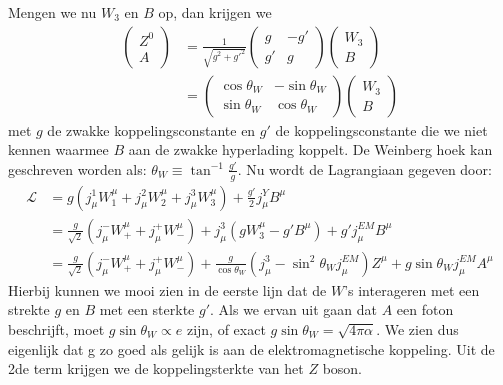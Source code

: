 \documentclass[../main.tex]{subfiles}
\begin{document}
Mengen we nu $W_3$ en $B$ op, dan krijgen we 
\begin{equation}
    \begin{aligned}
        \label{eq:w_b_mixing}
        \begin{pmatrix}
            Z^0\\
            A
        \end{pmatrix}
        &= \frac{1}{\sqrt{g^2+g'^2}} 
        \begin{pmatrix}
            g & -g'\\
            g' & g
        \end{pmatrix}
        \begin{pmatrix}
            W_3\\
            B
        \end{pmatrix}\\
        &=
        \begin{pmatrix}
            \cos\theta_W & -\sin\theta_W\\
            \sin\theta_W & \cos\theta_W
        \end{pmatrix}
        \begin{pmatrix}
            W_3\\
            B
        \end{pmatrix}
    \end{aligned}
\end{equation}
met $g$ de zwakke koppelingsconstante en $g'$ de koppelingsconstante die we niet kennen waarmee $B$ aan de zwakke hyperlading koppelt. De Weinberg hoek kan geschreven worden als: $\theta_W\equiv \tan^{-1} \frac{g'}{g}$. Nu wordt de Lagrangiaan gegeven door:
\begin{equation}
    \begin{aligned}
        \label{eq:elektozwakke_lagrangiaan}
        \mathcal{L} &= g(j_\mu^1W_1^\mu+j_\mu^2W_2^\mu+j_\mu^3W_3^\mu)+ \frac{g'}{2} j_\mu^YB^\mu\\
                    &= \frac{g}{\sqrt{2}} (j_\mu^-W_+^\mu+j_\mu^+W_-^\mu) + j_\mu^3(gW_3^\mu-g'B^\mu) + g'j_\mu^{EM}B^\mu\\
                    &= \frac{g}{\sqrt{2}} (j_\mu^-W_+^\mu+j_\mu^+W_-^\mu) + \frac{g}{\cos\theta_W} (j_\mu^3 - \sin^2\theta_Wj_\mu^{EM})Z^\mu + g\sin\theta_Wj_\mu^{EM}A^\mu
    \end{aligned}
\end{equation}
Hierbij kunnen we mooi zien in de eerste lijn dat de $W$'s interageren met een strekte $g$ en $B$ met een sterkte $g'$. Als we ervan uit gaan dat $A$ een foton beschrijft, moet $g\sin\theta_W \propto e$ zijn, of exact $g\sin\theta_W = \sqrt{4\pi\alpha}$. We zien dus eigenlijk dat g zo  goed als gelijk is aan de elektromagnetische koppeling. Uit de 2de term krijgen we de koppelingsterkte van het $Z$ boson.
\end{document}
